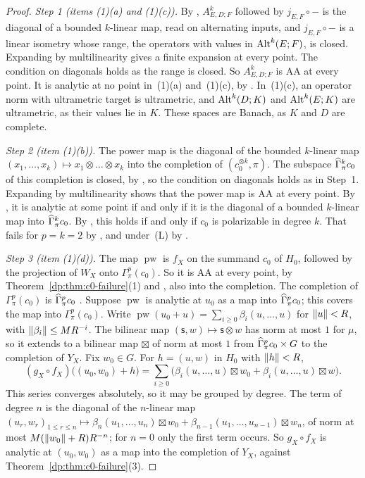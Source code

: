 \begin{proof}
\emph{Step 1 (items (1)(a) and (1)(c)).} By \cite[Proposition~2.2]{I}, $A^k_{E,D;F}$ followed by $j_{E,F}\circ{-}$ is the diagonal of a bounded $k$-linear map, read on alternating inputs, and $j_{E,F}\circ{-}$ is a linear isometry whose range, the operators with values in $\operatorname{Alt}^k(E;F)$, is closed. Expanding by multilinearity gives a finite expansion at every point. The condition on diagonals holds as the range is closed. So $A^k_{E,D;F}$ is AA at every point. It is analytic at no point in~(1)(a) and~(1)(c), by \cite[Theorem~7.2]{I}. In~(1)(c), an operator norm with ultrametric target is ultrametric, and $\operatorname{Alt}^k(D;K)$ and $\operatorname{Alt}^k(E;K)$ are ultrametric, as their values lie in $K$. These spaces are Banach, as $K$ and $D$ are complete.

\emph{Step 2 (item (1)(b)).} The power map is the diagonal of the bounded $k$-linear map $(x_1,\dots,x_k)\mapsto x_1\otimes\dots\otimes x_k$ into the completion of $(c_0^{\otimes k},\pi)$. The subspace $\widehat\Gamma^k_\pi c_0$ of this completion is closed, by \cite[Definition~3.8]{I}, so the condition on diagonals holds as in Step~1. Expanding by multilinearity shows that the power map is AA at every point. By \cite[Proposition~2.5]{I}, it is analytic at some point if and only if it is the diagonal of a bounded $k$-linear map into $\widehat\Gamma^k_\pi c_0$. By \cite[Lemma~3.11]{I}, this holds if and only if $c_0$ is polarizable in degree $k$. That fails for $p=k=2$ by \cite[Theorem~7.20(4)]{I}, and under~\textup{(L)} by \cite[Corollary~8.3]{I}.

\emph{Step 3 (item (1)(d)).} The map $\operatorname{pw}$ is $f_X$ on the summand $c_0$ of $H_0$, followed by the projection of $W_X$ onto $\Gamma^p_\pi(c_0)$. So it is AA at every point, by Theorem~\ref{dp:thm:c0-failure}(1) and \cite[Proposition~14.12(1)]{I}, also into the completion. The completion of $\Gamma^p_\pi(c_0)$ is $\widehat\Gamma^p_\pi c_0$ \cite[Section~Q.4]{I}. Suppose $\operatorname{pw}$ is analytic at $u_0$ as a map into $\widehat\Gamma^p_\pi c_0$; this covers the map into $\Gamma^p_\pi(c_0)$. Write $\operatorname{pw}(u_0+u)=\sum_{i\ge0}\beta_i(u,\dots,u)$ for $\lVert u\rVert<R$, with $\lVert \beta_i\rVert\le MR^{-i}$. The bilinear map $(\mathsf s,w)\mapsto\mathsf s\otimes w$ has norm at most $1$ for $\mu$, so it extends to a bilinear map $\boxtimes$ of norm at most $1$ from $\widehat\Gamma^p_\pi c_0\times G$ to the completion of $Y_X$. Fix $w_0\in G$. For $h=(u,w)$ in $H_0$ with $\lVert h\rVert<R$,
\[
 (g_X\circ f_X)\bigl((u_0,w_0)+h\bigr)=\sum_{i\ge0}\bigl(\beta_i(u,\dots,u)\boxtimes w_0+\beta_i(u,\dots,u)\boxtimes w\bigr).
\]
This series converges absolutely, so it may be grouped by degree. The term of degree $n$ is the diagonal of the $n$-linear map $(u_r,w_r)_{1\le r\le n}\mapsto\beta_n(u_1,\dots,u_n)\boxtimes w_0+\beta_{n-1}(u_1,\dots,u_{n-1})\boxtimes w_n$, of norm at most $M(\lVert w_0\rVert+R)R^{-n}$; for $n=0$ only the first term occurs. So $g_X\circ f_X$ is analytic at $(u_0,w_0)$ as a map into the completion of $Y_X$, against Theorem~\ref{dp:thm:c0-failure}(3).


\end{proof}
